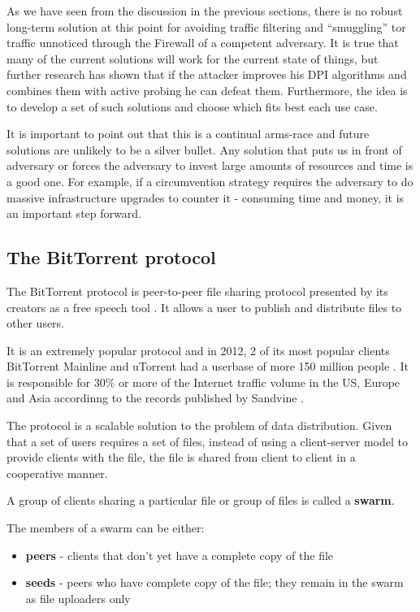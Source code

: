 \documentclass[11pt]{book} %
\begin{document}

As we have seen from the discussion in the previous sections, there is no robust long-term solution at this point for avoiding traffic filtering and “smuggling” tor traffic unnoticed through the Firewall of a competent adversary. It is true that many of the current solutions will work for the current state of things, but further research has shown that if the attacker improves his DPI algorithms and combines them with active probing he can defeat them. Furthermore, the idea is to develop a set of such solutions and choose which fits best each use case.

It is important to point out  that this is a continual arms-race and future solutions are unlikely to be a silver bullet. Any solution that puts us in front of adversary or forces the adversary to invest large amounts of resources and time is a good one. For example, if a circumvention strategy requires the adversary to do massive infrastructure upgrades to counter it - consuming time and money, it is an important step forward.

\subsection{The BitTorrent protocol}

The BitTorrent protocol is peer-to-peer file sharing protocol presented by its creators as a free speech tool \citep*{web:btIntro}. It allows a user to publish and distribute files to other users.

It is an extremely popular protocol and in 2012, 2 of its most popular clients BitTorrent Mainline and uTorrent had a userbase of more 150 million people  \citep*{web:btOrgUsers}. It is responsible for 30\% or more of the Internet traffic volume in the US, Europe and Asia accordinng to the records published by Sandvine \citep*{sandvineInternet}.

The protocol \citep*{btProtocol} is a scalable solution to the problem of data distribution. Given that a set of users requires a set of files, instead of using a client-server model to provide clients with the file, the file is shared from client to client in a cooperative manner.

A group of clients sharing a particular file or group of files is called a \textbf{swarm}. 

The members of a swarm can be either:
\begin{itemize}
\item \textbf{peers} - clients that don't yet have a complete copy of the file
\item \textbf{seeds} - peers who have complete copy of the file; they remain in the swarm as file uploaders only
\end{itemize}
\end{document}
